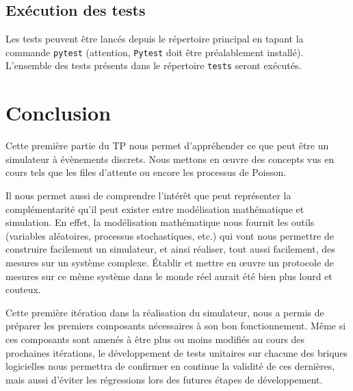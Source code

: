 \documentclass[11pt,a4paper]{article}
\begin{document}
\bigskip

\subsection{Exécution des tests}
Les tests peuvent être lancés depuis le répertoire principal en tapant la commande \lstinline|pytest| (attention, \lstinline|Pytest| doit être préalablement installé).
L'ensemble des tests présents dans le répertoire \lstinline|tests| seront exécutés.

\bigskip
\bigskip
\bigskip

\section{Conclusion}
Cette première partie du TP nous permet d'appréhender ce que peut être un simulateur à évènements discrets. Nous mettons en œuvre des concepts vus en cours tels que les files d'attente ou encore les processus de Poisson.

Il nous permet aussi de comprendre l'intérêt que peut représenter la complémentarité qu'il peut exister entre modélisation mathématique et simulation. En effet, la modélisation mathématique nous fournit les outils (variables aléatoires, processus stochastiques, etc.) qui vont nous permettre de construire facilement un simulateur, et ainsi réaliser, tout aussi facilement, des mesures sur un système complexe. Établir et mettre en œuvre un protocole de mesures sur ce même système dans le monde réel aurait été bien plus lourd et couteux.

Cette première itération dans la réalisation du simulateur, nous a permis de préparer les premiers composants nécessaires à son bon fonctionnement. Même si ces composants sont amenés à être plus ou moins modifiés au cours des prochaines itérations, le développement de tests unitaires sur chacune des briques logicielles nous permettra de confirmer en continue la validité de ces dernières, mais aussi d'éviter les régressions lors des futures étapes de développement.
\end{document}
